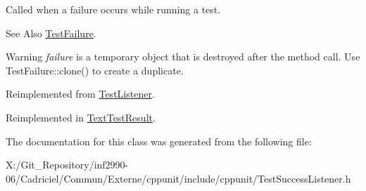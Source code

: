 Called when a failure occurs while running a test. 

\begin{DoxySeeAlso}{See Also}
\hyperlink{class_test_failure}{Test\-Failure}. 
\end{DoxySeeAlso}
\begin{DoxyWarning}{Warning}
{\itshape failure} is a temporary object that is destroyed after the method call. Use Test\-Failure\-::clone() to create a duplicate. 
\end{DoxyWarning}


Reimplemented from \hyperlink{class_test_listener_a103216a5814c907f7b752b969477e765}{Test\-Listener}.



Reimplemented in \hyperlink{class_text_test_result_a05d3b0e8e51b3430092166bbc3d17708}{Text\-Test\-Result}.



The documentation for this class was generated from the following file\-:\begin{DoxyCompactItemize}
\item 
X\-:/\-Git\-\_\-\-Repository/inf2990-\/06/\-Cadriciel/\-Commun/\-Externe/cppunit/include/cppunit/Test\-Success\-Listener.\-h\end{DoxyCompactItemize}
